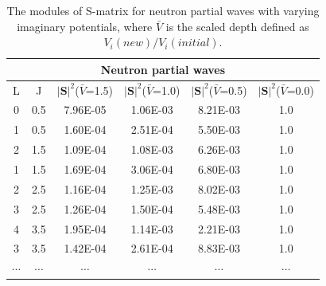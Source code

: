 \documentclass[12pt]{article}
\begin{document}
\begin{table}[]
\centering
\begin{tabular}{cccccc}
\toprule
\toprule
\multicolumn{6}{c}{Neutron partial waves}                                                                         \\
 \midrule
L                     & J                     & $|\mathbf{S}|^2$($\bar{V}$=1.5) & $|\mathbf{S}|^2$($\bar{V}$=1.0) & $|\mathbf{S}|^2$($\bar{V}$=0.5) & $|\mathbf{S}|^2$($\bar{V}$=0.0) \\
0 & 0.5 & 7.96E-05                         & 1.06E-03                     & 8.21E-03                          & 1.0                          \\
1 & 0.5 & 1.60E-04                          & 2.51E-04                     & 5.50E-03                         & 1.0                          \\
2 & 1.5 & 1.09E-04                          & 1.08E-03                     & 6.26E-03                         & 1.0                          \\
1 & 1.5 & 1.69E-04                          & 3.06E-04                     & 6.80E-03                         & 1.0                          \\
2 & 2.5 & 1.16E-04                          & 1.25E-03                     & 8.02E-03                          & 1.0                          \\
3 & 2.5 & 1.26E-04                          & 1.50E-04                     & 5.48E-03                         & 1.0                          \\
4 & 3.5 & 1.95E-04                          & 1.14E-03                     & 2.21E-03                         & 1.0                          \\
3 & 3.5 & 1.42E-04                          & 2.61E-04                     & 8.83E-03                          & 1.0                          \\   
$\cdots$           &$\cdots$                    & $\cdots$                            & $\cdots$                           & $\cdots$                           & $\cdots$                                                                \\
\bottomrule
\bottomrule
\end{tabular}
\caption{The modules of S-matrix for neutron partial waves with varying imaginary potentials, where $\bar{V}$ is the scaled depth defined as $V_i(new)/V_i(initial)$.}
\label{nSmatrix}
\end{table}
	
\end{document}
